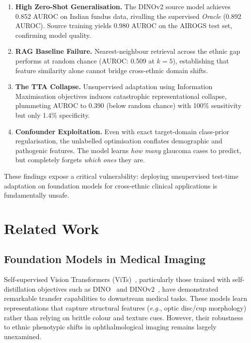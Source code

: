 \documentclass[11pt,twocolumn]{article}
\newcommand{\eg}{\emph{e.g.}}
\begin{document}
\begin{enumerate}[leftmargin=*,itemsep=2pt]
    \item \textbf{High Zero-Shot Generalisation.} The DINOv2 source model achieves 0.852 AUROC on Indian fundus data, rivalling the supervised \emph{Oracle} (0.892 AUROC). Source training yields 0.980 AUROC on the AIROGS test set, confirming model quality.
    \item \textbf{RAG Baseline Failure.} Nearest-neighbour retrieval across the ethnic gap performs at random chance (AUROC: 0.509 at $k{=}5$), establishing that feature similarity alone cannot bridge cross-ethnic domain shifts.
    \item \textbf{The TTA Collapse.} Unsupervised adaptation using Information Maximisation objectives induces catastrophic representational collapse, plummeting AUROC to 0.390 (below random chance) with 100\% sensitivity but only 1.4\% specificity.
    \item \textbf{Confounder Exploitation.} Even with exact target-domain class-prior regularisation, the unlabelled optimisation conflates demographic and pathogenic features. The model learns \emph{how many} glaucoma cases to predict, but completely forgets \emph{which ones} they are.
\end{enumerate}

These findings expose a critical vulnerability: deploying unsupervised test-time adaptation on foundation models for cross-ethnic clinical applications is fundamentally unsafe.

\section{Related Work}
\label{sec:related}

\subsection{Foundation Models in Medical Imaging}
Self-supervised Vision Transformers (ViTs)~\citep{dosovitskiy2021vit}, particularly those trained with self-distillation objectives such as DINO~\citep{caron2021dino} and DINOv2~\citep{oquab2024dinov2}, have demonstrated remarkable transfer capabilities to downstream medical tasks. These models learn representations that capture structural features (\eg, optic disc/cup morphology) rather than relying on brittle colour and texture cues. However, their robustness to ethnic phenotypic shifts in ophthalmological imaging remains largely unexamined.
\end{document}
